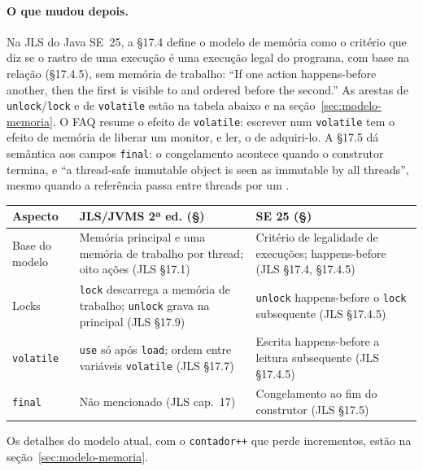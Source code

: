 \paragraph{O que mudou depois.}
Na JLS do Java SE~25, a §17.4 define o modelo de memória como o
critério que diz se o rastro de uma execução é uma execução legal do
programa, com base na relação
 (§17.4.5), sem memória de trabalho: \enquote{If one action happens-before another,
then the first is visible to and ordered before the second.} As
arestas de \texttt{unlock}/\texttt{lock} e de \texttt{volatile} estão
na tabela abaixo e na seção~\ref{sec:modelo-memoria}. O FAQ resume o
efeito de \texttt{volatile}: escrever num
\texttt{volatile} tem o efeito de memória de liberar um monitor, e ler,
o de adquiri-lo. A §17.5 dá semântica aos campos \texttt{final}: o
congelamento acontece quando o construtor termina, e \enquote{a
thread-safe immutable object is seen as immutable by all threads}, mesmo
quando a referência passa entre threads por um
.

\begin{center}
\begin{tabular}{@{}p{}p{}p{}@{}}
\toprule
Aspecto & JLS/JVMS 2ª ed. (§) & SE 25 (§) \\
\midrule
Base do modelo & Memória principal e uma memória de trabalho por
thread; oito ações (JLS §17.1) & Critério de legalidade de execuções;
happens-before (JLS §17.4, §17.4.5) \\
Locks & \texttt{lock} descarrega a memória de trabalho;
\texttt{unlock} grava na principal (JLS §17.9) & \texttt{unlock}
happens-before o \texttt{lock} subsequente (JLS §17.4.5) \\
\texttt{volatile} & \texttt{use} só após \texttt{load}; ordem entre
variáveis \texttt{volatile} (JLS §17.7) & Escrita happens-before a leitura subsequente
(JLS §17.4.5) \\
\texttt{final} & Não mencionado (JLS cap.~17) & Congelamento ao fim do
construtor (JLS §17.5) \\
\bottomrule
\end{tabular}
\end{center}

Os detalhes do modelo atual, com o \texttt{contador++} que perde
incrementos, estão na seção~\ref{sec:modelo-memoria}.



